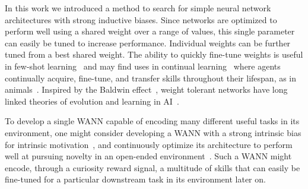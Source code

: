 
In this work we introduced a method to search for simple neural network architectures with strong inductive biases. %
%
Since networks are optimized to perform well using a shared weight over a range of values, this single parameter can easily be tuned to increase performance.
%
Individual weights can be further tuned from a best shared weight. The ability to quickly fine-tune weights is useful in few-shot learning~\cite{finn2017model} and may find uses in continual learning~\cite{parisi2018continual} where agents continually acquire, fine-tune, and transfer skills throughout their lifespan, as in animals~\cite{zador2019critique}.
%
Inspired by the Baldwin effect~\cite{baldwin1896new}, weight tolerant networks have long linked theories of evolution and learning in AI~\cite{ackley1991interactions,hinton1996learning,smith1987learning}.




% 

To develop a single WANN capable of encoding many different useful tasks in its environment, one might consider developing a WANN with a strong intrinsic bias for intrinsic motivation~\cite{schmidhuber1991curious,oudeyer2007intrinsic,pathak2017curiosity}, and continuously optimize its architecture to perform well at pursuing novelty in an open-ended environment~\cite{lehman2008exploiting}. Such a WANN might encode, through a curiosity reward signal, a multitude of skills that can easily be fine-tuned for a particular downstream task in its environment later on.


